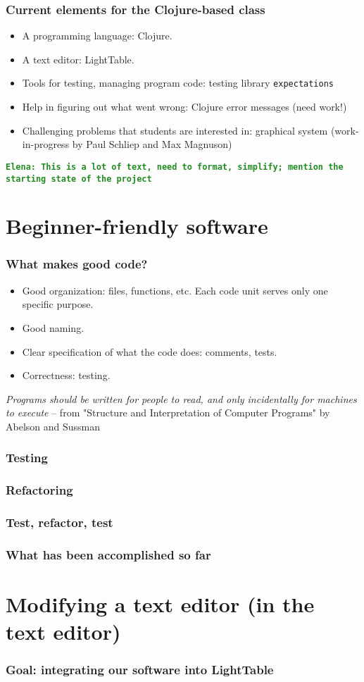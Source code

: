 \documentclass{beamer}
\newcommand{\comment}[1]{{\bf \tt  {#1}}}
\newcommand{\emcomment}[1]{\textcolor{ForestGreen}{\comment{Elena: {#1}}}}
\begin{document}
\begin{frame}[fragile]
\frametitle{Current elements for the Clojure-based class}
\begin{itemize}
\item A programming language: Clojure. 
\item A text editor: LightTable.
\item Tools for testing, managing program code: testing library {\tt expectations}
\item Help in figuring out what went wrong: Clojure error messages (need work!)
\item Challenging problems that students are interested in: graphical system (work-in-progress by Paul Schliep and Max Magnuson)
\end{itemize}
\emcomment{This is a lot of text, need to format, simplify; mention the starting state of the project}
\end{frame}

\section{Beginner-friendly software}

\begin{frame}[fragile]
\frametitle{What makes good code?}

\begin{itemize}
\item Good organization: files, functions, etc. Each code unit serves only one specific purpose. 
\item Good naming.
\item Clear specification of what the code does: comments, tests.
\item Correctness: testing. 
\end{itemize}
{\it Programs should be written for people to read, and only incidentally for machines to execute} --	 
from "Structure and Interpretation of Computer Programs" by Abelson and Sussman	
\end{frame}

\begin{frame}[fragile]
\frametitle{Testing}
		
\end{frame}

\begin{frame}[fragile]
\frametitle{Refactoring}
		
\end{frame}

\begin{frame}[fragile]
\frametitle{Test, refactor, test}
		
\end{frame}

\begin{frame}[fragile]
\frametitle{What has been accomplished so far}
		
\end{frame}

\section{Modifying a text editor (in the text editor)}

\begin{frame}[fragile]
\frametitle{Goal: integrating our software into LightTable}
		
\end{frame}
\end{document}
